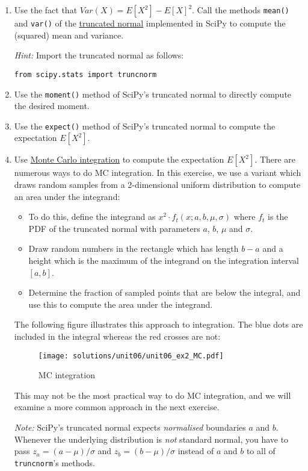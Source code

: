 \documentclass{scrartcl}
\providecommand{\tightlist}{%
      \setlength{\itemsep}{0pt}\setlength{\parskip}{0pt}}
\begin{document}
\begin{enumerate}
\def\labelenumi{\arabic{enumi}.}
\item
  Use the fact that \(Var(X) = E[X^2] - E[X]^2\). Call the methods
  \texttt{mean()} and \texttt{var()} of the
  \href{https://docs.scipy.org/doc/scipy/reference/generated/scipy.stats.truncnorm.html}{truncated
  normal} implemented in SciPy to compute the (squared) mean and
  variance.

  \emph{Hint:} Import the truncated normal as follows:

\begin{verbatim}
from scipy.stats import truncnorm
\end{verbatim}
\item
  Use the \texttt{moment()} method of SciPy's truncated normal to
  directly compute the desired moment.
\item
  Use the \texttt{expect()} method of SciPy's truncated normal to
  compute the expectation \(E[X^2]\).
\item
  Use \href{https://en.wikipedia.org/wiki/Monte_Carlo_integration}{Monte
  Carlo integration} to compute the expectation \(E[X^2]\). There are
  numerous ways to do MC integration. In this exercise, we use a variant
  which draws random samples from a 2-dimensional uniform distribution
  to compute an area under the integrand:

  \begin{itemize}
  \tightlist
  \item
    To do this, define the integrand as
    \(x^2 \cdot f_t(x;a,b,\mu,\sigma)\) where \(f_t\) is the PDF of the
    truncated normal with parameters \(a\), \(b\), \(\mu\) and
    \(\sigma\).
  \item
    Draw random numbers in the rectangle which has length \(b-a\) and a
    height which is the maximum of the integrand on the integration
    interval \([a,b]\).
  \item
    Determine the fraction of sampled points that are below the
    integral, and use this to compute the area under the integrand.
  \end{itemize}

  The following figure illustrates this approach to integration. The
  blue dots are included in the integral whereas the red crosses are
  not:

  \begin{figure}
  \centering
  \texttt{[image: solutions/unit06/unit06\_ex2\_MC.pdf]}
  \caption{MC integration}
  \end{figure}

  This may not be the most practical way to do MC integration, and we
  will examine a more common approach in the next exercise.

  \emph{Note:} SciPy's truncated normal expects \emph{normalised}
  boundaries \(a\) and \(b\). Whenever the underlying distribution is
  \emph{not} standard normal, you have to pass \(z_a = (a-\mu)/\sigma\)
  and \(z_b = (b-\mu)/\sigma\) instead of \(a\) and \(b\) to all of
  \texttt{truncnorm}'s methods.
\end{enumerate}
\end{document}
